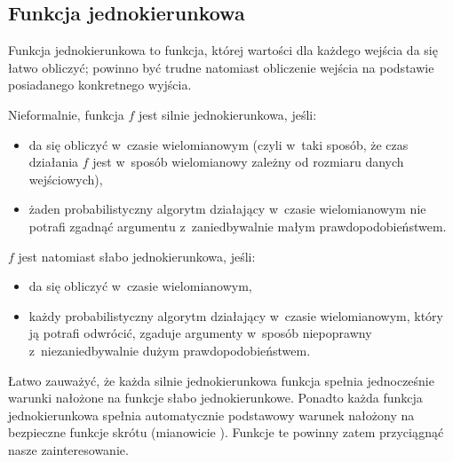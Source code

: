 \documentclass[12pt,a4paper,twoside]{article}
\begin{document}
\subsection{Funkcja jednokierunkowa}
Funkcja jednokierunkowa to funkcja, której wartości dla każdego wejścia da się
łatwo obliczyć; powinno być trudne natomiast obliczenie wejścia na podstawie
posiadanego konkretnego wyjścia.

\noindent Nieformalnie, funkcja $f$ jest silnie jednokierunkowa, jeśli:

\begin{itemize}

    \item da się obliczyć w~czasie wielomianowym (czyli w~taki sposób, że czas
    działania $f$ jest w~sposób wielomianowy zależny od rozmiaru danych
    wejściowych),

    \item żaden probabilistyczny algorytm działający w~czasie wielomianowym nie
    potrafi zgadnąć argumentu z~zaniedbywalnie małym prawdopodobieństwem.

\end{itemize}

\noindent $f$ jest natomiast słabo jednokierunkowa, jeśli:

\begin{itemize}

    \item da się obliczyć w~czasie wielomianowym,

    \item każdy probabilistyczny algorytm działający w~czasie wielomianowym,
    który ją potrafi odwrócić, zgaduje argumenty w~sposób niepoprawny
    z~niezaniedbywalnie dużym prawdopodobieństwem.

\end{itemize}

Łatwo zauważyć, że każda silnie jednokierunkowa funkcja spełnia jednocześnie
warunki nałożone na funkcje słabo jednokierunkowe. Ponadto każda funkcja
jednokierunkowa spełnia automatycznie podstawowy warunek nałożony na bezpieczne
funkcje skrótu (mianowicie ). Funkcje te
powinny zatem przyciągnąć nasze zainteresowanie.
\end{document}
